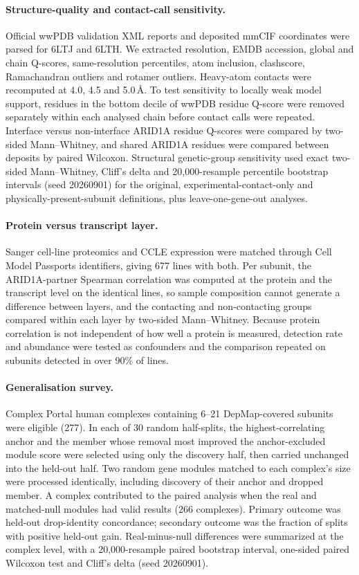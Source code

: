 \documentclass[11pt,a4paper]{article}
\begin{document}
\paragraph{Structure-quality and contact-call sensitivity.} Official wwPDB
validation XML reports and deposited mmCIF coordinates were parsed for 6LTJ and
6LTH. We extracted resolution, EMDB accession, global and chain Q-scores,
same-resolution percentiles, atom inclusion, clashscore, Ramachandran outliers
and rotamer outliers. Heavy-atom contacts were recomputed at 4.0, 4.5 and
5.0\,\AA{}. To test sensitivity to locally weak model support, residues in the
bottom decile of wwPDB residue Q-score were removed separately within each
analysed chain before contact calls were repeated. Interface versus
non-interface ARID1A residue Q-scores were compared by two-sided Mann--Whitney,
and shared ARID1A residues were compared between deposits by paired Wilcoxon.
Structural genetic-group sensitivity used exact two-sided Mann--Whitney,
Cliff's delta and 20{,}000-resample percentile bootstrap intervals (seed
20260901) for the original, experimental-contact-only and
physically-present-subunit definitions, plus leave-one-gene-out analyses.

\paragraph{Protein versus transcript layer.} Sanger cell-line proteomics
\citep{goncalves2022} and CCLE expression were matched through Cell Model
Passports identifiers, giving 677 lines with both. Per subunit, the ARID1A-partner
Spearman correlation was computed at the protein and the transcript level on the
identical lines, so sample composition cannot generate a difference between
layers, and the contacting and non-contacting groups compared within each layer by
two-sided Mann--Whitney. Because protein correlation is not independent of how
well a protein is measured, detection rate and abundance were tested as
confounders and the comparison repeated on subunits detected in over 90\% of
lines.

\paragraph{Generalisation survey.} Complex Portal human complexes containing
6--21 DepMap-covered subunits were eligible (277). In each of 30 random
half-splits, the highest-correlating anchor and the member whose removal most
improved the anchor-excluded module score were selected using only the discovery
half, then carried unchanged into the held-out half. Two random gene modules
matched to each complex's size were processed identically, including discovery
of their anchor and dropped member. A complex contributed to the paired analysis
when the real and matched-null modules had valid results (266 complexes).
Primary outcome was held-out drop-identity concordance; secondary outcome was
the fraction of splits with positive held-out gain. Real-minus-null differences
were summarized at the complex level, with a 20{,}000-resample paired bootstrap
interval, one-sided paired Wilcoxon test and Cliff's delta (seed 20260901).
\end{document}
